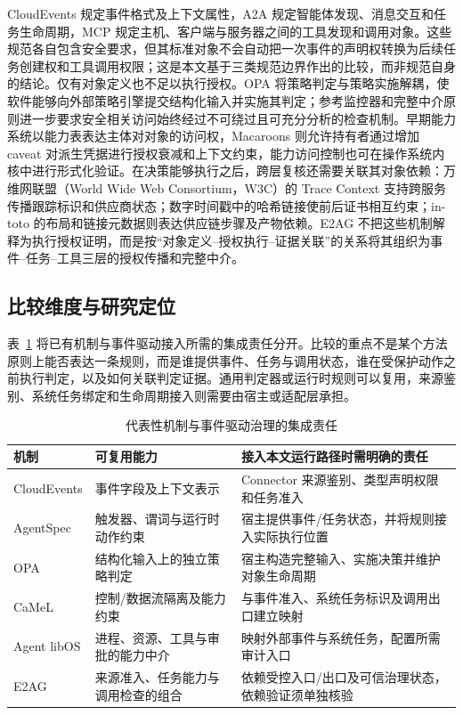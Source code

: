 CloudEvents 规定事件格式及上下文属性，A2A 规定智能体发现、消息交互和任务生命周期，MCP 规定主机、客户端与服务器之间的工具发现和调用对象\cite{cloudevents,a2a,mcp}。这些规范各自包含安全要求，但其标准对象不会自动把一次事件的声明权转换为后续任务创建权和工具调用权限；这是本文基于三类规范边界作出的比较，而非规范自身的结论。仅有对象定义也不足以执行授权。OPA 将策略判定与策略实施解耦，使软件能够向外部策略引擎提交结构化输入并实施其判定\cite{opa}；参考监控器和完整中介原则进一步要求安全相关访问始终经过不可绕过且可充分分析的检查机制\cite{reference-monitor,saltzer-schroeder}。早期能力系统以能力表表达主体对对象的访问权，Macaroons 则允许持有者通过增加 caveat 对派生凭据进行授权衰减和上下文约束，能力访问控制也可在操作系统内核中进行形式化验证\cite{dennis-capability,macaroons,cap-os}。在决策能够执行之后，跨层复核还需要关联其对象依赖：万维网联盟（World Wide Web Consortium，W3C）的 Trace Context 支持跨服务传播跟踪标识和供应商状态；数字时间戳中的哈希链接使前后证书相互约束；in-toto 的布局和链接元数据则表达供应链步骤及产物依赖\cite{trace-context,haber-stornetta,in-toto}。E2AG 不把这些机制解释为执行授权证明，而是按“对象定义--授权执行--证据关联”的关系将其组织为事件--任务--工具三层的授权传播和完整中介。

\subsection{比较维度与研究定位}

表~\ref{tab:related-scope-v11} 将已有机制与事件驱动接入所需的集成责任分开。比较的重点不是某个方法原则上能否表达一条规则，而是谁提供事件、任务与调用状态，谁在受保护动作之前执行判定，以及如何关联判定证据。通用判定器或运行时规则可以复用，来源鉴别、系统任务绑定和生命周期接入则需要由宿主或适配层承担。

\begin{table}[htbp]
\centering
\caption{代表性机制与事件驱动治理的集成责任}
\label{tab:related-scope-v11}
\small
\begin{tabular}{p{23mm}p{49mm}p{65mm}}
\toprule
机制 & 可复用能力 & 接入本文运行路径时需明确的责任 \\
\midrule
CloudEvents & 事件字段及上下文表示 & Connector 来源鉴别、类型声明权限和任务准入 \\
AgentSpec & 触发器、谓词与运行时动作约束 & 宿主提供事件/任务状态，并将规则接入实际执行位置 \\
OPA & 结构化输入上的独立策略判定 & 宿主构造完整输入、实施决策并维护对象生命周期 \\
CaMeL & 控制/数据流隔离及能力约束 & 与事件准入、系统任务标识及调用出口建立映射 \\
Agent libOS & 进程、资源、工具与审批的能力中介 & 映射外部事件与系统任务，配置所需审计入口 \\
E2AG & 来源准入、任务能力与调用检查的组合 & 依赖受控入口/出口及可信治理状态，依赖验证须单独核验 \\
\bottomrule
\end{tabular}
\end{table}

